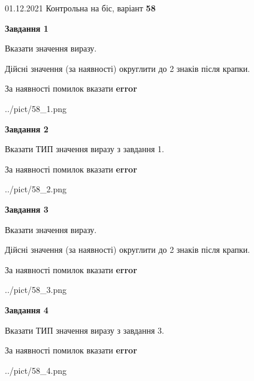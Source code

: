 \documentclass[11pt, ukrainian]{article}
\begin{document}
{01.12.2021 Контрольна на біс, варіант  \No \textbf { 58 }\par}
{
\begin {large}
{\begin {center}\textbf{Завдання 1}\end {center}}\par
Вказати значення виразу. \par
Дійсні значення (за наявності) округлити до 2 знаків після крапки. \par
За наявності помилок вказати \textbf{error}

\begin{center}
	{../pict/58_1.png}
\end{center}
\newpage

{\begin {center}\textbf{Завдання 2}\end {center}}\par
Вказати ТИП значення виразу з завдання 1. \par
За наявності помилок вказати \textbf{error}

\begin{center}
	{../pict/58_2.png}
\end{center}
\newpage

{\begin {center}\textbf{Завдання 3}\end {center}}\par
Вказати значення виразу. \par
Дійсні значення (за наявності) округлити до 2 знаків після крапки. \par
За наявності помилок вказати \textbf{error}

\begin{center}
	{../pict/58_3.png}
\end{center}
\newpage

{\begin {center}\textbf{Завдання 4}\end {center}}\par
Вказати ТИП значення виразу з завдання 3. \par
За наявності помилок вказати \textbf{error}

\begin{center}
	{../pict/58_4.png}
\end{center}
\newpage


\end{large}}
\end{document}
